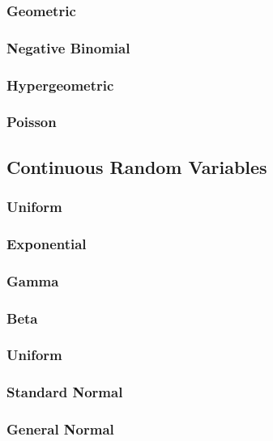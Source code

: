 \documentclass[a4paper,10pt]{article}
\begin{document}
\subsubsection{Geometric}

\subsubsection{Negative Binomial}

\subsubsection{Hypergeometric}

\subsubsection{Poisson}


\subsection{Continuous Random Variables}

\subsubsection{Uniform}

\subsubsection{Exponential}

\subsubsection{Gamma}

\subsubsection{Beta}

\subsubsection{Uniform}

\subsubsection{Standard Normal}

\subsubsection{General Normal}
\end{document}
